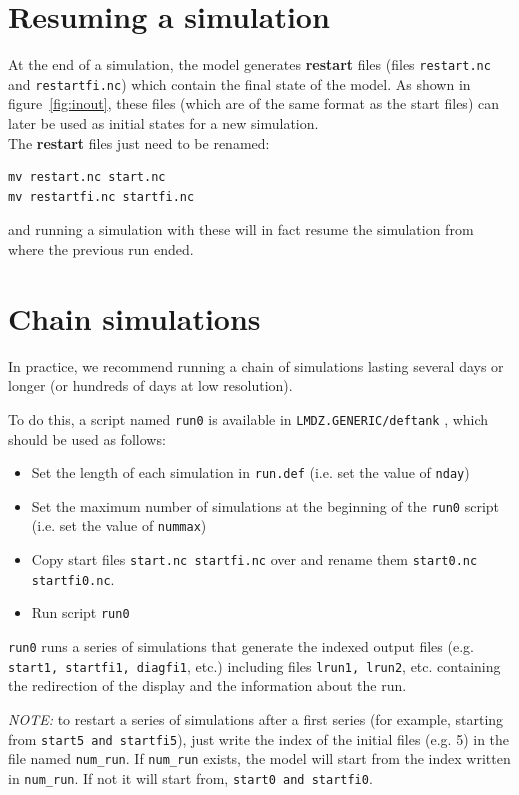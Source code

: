 
\section{Resuming a simulation}
At the end of a simulation, the model generates {\bf restart} files
(files {\tt restart.nc} and {\tt restartfi.nc})
which contain the final state of the model.
As shown in figure~\ref{fig:inout},
these files (which are of the same format as the start files)
can later be used as initial
states for a new simulation.\\

\noindent
The {\bf restart} files just need to be renamed:
\begin{verbatim}
mv restart.nc start.nc
mv restartfi.nc startfi.nc
\end{verbatim}
\noindent
and running a simulation with these will in fact resume the simulation
from where the previous run ended.

\section{Chain simulations}

In practice, we recommend running a chain of simulations lasting several
days or longer (or hundreds of days at low resolution).

To do this, a script named {\tt run0} is available in
\verb+LMDZ.GENERIC/deftank+ , which should be used as follows:
\begin{itemize}
\item Set the length of each simulation in {\tt run.def}
 (i.e. set the value of {\tt nday})
\item Set the maximum number of simulations at the beginning of the {\tt run0}
script (i.e. set the value of {\tt nummax})
\item Copy start files {\tt start.nc  startfi.nc} over and rename them
      {\tt start0.nc startfi0.nc}.
\item Run script {\tt run0}
\end{itemize}

{\tt run0} runs a series of simulations that generate the indexed output
files (e.g. {\tt start1, startfi1, diagfi1}, etc.)
including files {\tt lrun1, lrun2}, etc. containing the redirection of the
display and the information about the run.

{\it NOTE:} to restart a series of simulations after a first series
(for example, starting from {\tt start5 and  startfi5}), just write the
index of the initial files (e.g. 5) in the file named {\tt num\_run}.
If {\tt num\_run} exists, the model will start from the index written in
{\tt num\_run}. If not it will start from, {\tt start0 and startfi0}.


